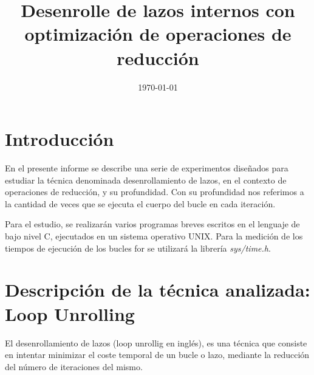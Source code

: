 \documentclass[a4paper,twocolumn]{article}
\title{Desenrolle de lazos internos con optimización de operaciones de reducción} %
\date{\today} %
\begin{document}
	
	\maketitle
	
	
	\section{Introducción}

        En el presente informe se describe una serie de experimentos diseñados para estudiar la técnica denominada desenrollamiento de lazos, en el contexto de operaciones de reducción, y su profundidad. Con su profundidad nos referimos a la cantidad de veces que se ejecuta el cuerpo del bucle en cada iteración.
        
        Para el estudio, se realizarán varios programas breves escritos en el lenguaje de bajo nivel C, ejecutados en un sistema operativo UNIX. Para la medición de los tiempos de ejecución de los bucles for se utilizará la librería \textit{sys/time.h}.

 
	
	

	

\section{Descripción de la técnica analizada: Loop Unrolling}

El desenrollamiento de lazos (loop unrollig en inglés), es una técnica que consiste en intentar minimizar el coste temporal de un bucle o lazo, mediante la reducción del número de iteraciones del mismo. 
\end{document}
